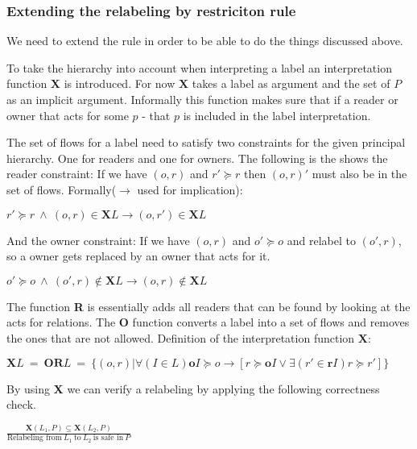 \subsubsection{Extending the relabeling by restriciton rule}
We need to extend the rule in order to be able to do the things discussed above.

To take the \principal{} hierarchy into account when interpreting a label an interpretation function $\textbf{X}$ is introduced.
For now $\textbf{X}$ takes a label as argument and the set of \principals{} $P$ as an implicit argument.
Informally this function makes sure that if a reader or owner that acts for some \principal{} $p$ - that $p$ is included in the label interpretation.


The set of flows for a label need to satisfy two constraints for the given principal hierarchy.
One for readers and one for owners.
The following is the shows the reader constraint:
If we have $(o,r)$ and $r' \succeq r$ then $(o,r)'$ must also be in the set of flows.
Formally($\rightarrow$ used for implication):
\begin{center}
  $r' \succeq r \ \wedge \ (o,r) \in \textbf{X}L \rightarrow (o,r') \in \textbf{X}L$
\end{center}
And the owner constraint:
If we have $(o,r)$ and $o' \succeq o$ and relabel to $(o',r)$, so a owner gets replaced by an owner that acts for it.
\begin{center}
  $o' \succeq o \ \wedge \ (o',r) \notin \textbf{X}L \rightarrow (o,r) \notin \textbf{X}L$
\end{center}

The function \textbf{R} is essentially adds all readers that can be found by looking at the acts for relations.
The \textbf{O} function converts a label into a set of flows and removes the ones that are not allowed.
Definition of the interpretation function $\textbf{X}$:
\begin{definition}
  $\textbf{X}L \ = \ \textbf{OR}L \ = \ \{(o,r)|\forall (I \in L) \textbf{o}I \succeq o \rightarrow [r \succeq \textbf{o}I \vee \exists (r' \in \textbf{r}I) r \succeq r'] \}$
\end{definition}

By using \textbf{X} we can verify a relabeling by applying the following correctness check.
\begin{definition}
  $\frac{\textbf{X}(L_1, P)\subseteq \textbf{X}(L_2,P)}{\mbox{Relabeling from} \ L_1 \ \mbox{to} \ L_2 \ \mbox{is safe in} \ P }$
\end{definition}

